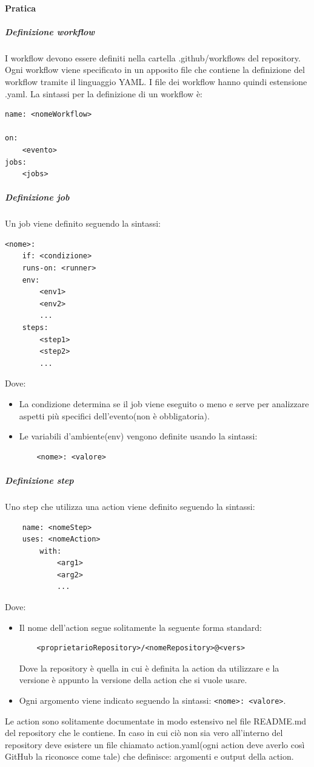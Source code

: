 \paragraph{Pratica}

\subparagraph{Definizione workflow}
I workflow devono essere definiti nella cartella .github/workflows del repository.
Ogni workflow viene specificato in un apposito file che contiene la definizione del workflow tramite il linguaggio YAML.
I file dei workflow hanno quindi estensione .yaml.
La sintassi per la definizione di un workflow è:
\begin{lstlisting}
name: <nomeWorkflow>

on:
    <evento>
jobs:
    <jobs>
\end{lstlisting}

\subparagraph{Definizione job}
Un job viene definito seguendo la sintassi:
\begin{lstlisting}
<nome>:
    if: <condizione>
    runs-on: <runner>
    env:
        <env1>
        <env2>
        ...
    steps:
        <step1>
        <step2>
        ...
\end{lstlisting}
Dove:
\begin{itemize}
    \item La condizione determina se il job viene eseguito o meno e serve per analizzare aspetti più specifici dell'evento(non è obbligatoria).
    
    \item Le variabili d'ambiente(env) vengono definite usando la sintassi:
    \begin{lstlisting}
    <nome>: <valore>
    \end{lstlisting}
\end{itemize}

\subparagraph{Definizione step}
Uno step che utilizza una action viene definito seguendo la sintassi:
\begin{lstlisting}
    name: <nomeStep>
    uses: <nomeAction>
        with:
            <arg1>
            <arg2>
            ...
\end{lstlisting}
Dove:
\begin{itemize}
    \item Il nome dell'action segue solitamente la seguente forma standard: 
    \begin{lstlisting}
    <proprietarioRepository>/<nomeRepository>@<vers>
    \end{lstlisting}
    Dove la repository è quella in cui è definita la action da utilizzare e la versione è appunto la versione della action che si vuole usare.
    \item  Ogni argomento viene indicato seguendo la sintassi: \texttt{<nome>: <valore>}.
\end{itemize}
Le action sono solitamente documentate in modo estensivo nel file README.md del repository che le contiene.
In caso in cui ciò non sia vero all'interno del repository deve esistere un file chiamato action.yaml(ogni action deve averlo così GitHub la riconosce come tale) che definisce: argomenti e output della action.

